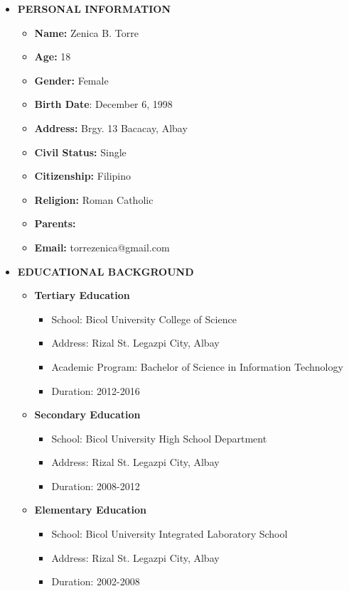 \begin{itemize}
	\vspace{-25mm}
	\item []\textbf{ PERSONAL INFORMATION}
	\begin{itemize}
		\item  \textbf{Name:} {Zenica B. Torre}
		\item  \textbf{Age:} {18}
		\item  \textbf{Gender:} {Female}
		\item  \textbf{Birth Date}: {December 6, 1998}
		\item  \textbf{Address:} {Brgy. 13 Bacacay, Albay}
		\item  \textbf{Civil Status:} {Single}
		\item  \textbf{Citizenship:} {Filipino}
		\item  \textbf{Religion:} {Roman Catholic}
		\item  \textbf{Parents:} {}
		\item  \textbf{Email:} {torrezenica@gmail.com}
	\end{itemize}
	\item []\textbf{EDUCATIONAL BACKGROUND}
	\begin{itemize}
		\item \textbf{Tertiary Education}
		\begin{itemize}
			\item School: Bicol University College of Science
			\item Address: Rizal St. Legazpi City, Albay
			\item Academic Program: Bachelor of Science in Information Technology
			\item Duration: 2012-2016
		\end{itemize}
		\item \textbf{Secondary Education}
		\begin{itemize}
			\item School: Bicol University High School Department
			\item Address: Rizal St. Legazpi City, Albay
			\item Duration: 2008-2012
		\end{itemize}
		\item \textbf{Elementary Education}
		\begin{itemize}
			\item School: Bicol University Integrated Laboratory School
			\item Address: Rizal St. Legazpi City, Albay
			\item Duration: 2002-2008
		\end{itemize}
	\end{itemize}
\end{itemize}
	
